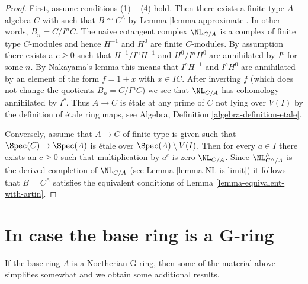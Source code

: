 \begin{proof}
First, assume conditions (1) -- (4) hold. Then there exists
a finite type $A$-algebra $C$ with such that $B \cong C^\wedge$
by Lemma \ref{lemma-approximate}. In other words, $B_n = C/I^nC$.
The naive cotangent complex $\NL_{C/A}$ is a complex of finite type
$C$-modules and hence $H^{-1}$ and $H^0$ are finite $C$-modules.
By assumption there exists a $c \geq 0$ such that
$H^{-1}/I^nH^{-1}$ and $H^0/I^nH^0$ are annihilated by $I^c$
for some $n$. By Nakayama's lemma this means that
$I^cH^{-1}$ and $I^cH^0$ are annihilated by an element of the
form $f = 1 + x$ with $x \in IC$. After inverting $f$
(which does not change the quotients $B_n = C/I^nC$)
we see that $\NL_{C/A}$ has cohomology annihilated by $I^c$. Thus
$A \to C$ is \'etale at any prime of $C$ not lying over $V(I)$
by the definition of \'etale ring maps, see
Algebra, Definition \ref{algebra-definition-etale}.

\medskip\noindent
Conversely, assume that $A \to C$ of finite type is given such that
$\Spec(C) \to \Spec(A)$ is \'etale over $\Spec(A) \setminus V(I)$.
Then for every $a \in I$ there exists an $c \geq 0$ such that
multiplication by $a^c$ is zero $\NL_{C/A}$.
Since $\NL^\wedge_{C^\wedge/A}$ is the derived completion of
$\NL_{C/A}$ (see Lemma \ref{lemma-NL-is-limit}) it follows that
$B = C^\wedge$ satisfies the equivalent conditions of
Lemma \ref{lemma-equivalent-with-artin}.
\end{proof}








\section{In case the base ring is a G-ring}
\label{section-over-G-ring}

\noindent
If the base ring $A$ is a Noetherian G-ring, then some of the material
above simplifies somewhat and we obtain some additional results.

